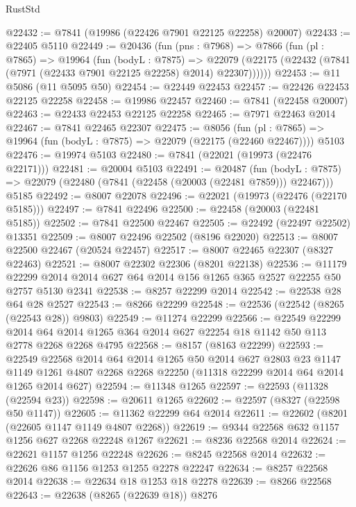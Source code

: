 \begin{lexlean}{RustStd}
\begin{coremodule}
@22432 := @7841 (@19986 (@22426 @7901 @22125 @22258) @20007)
@22433 := @22405 @5110
@22449 := @20436
    (fun (pns : @7968) =>
    @7866
      (fun (pl : @7865) =>
      @19964
        (fun (bodyL : @7875) =>
        @22079 (@22175 (@22432 (@7841 (@7971 (@22433 @7901 @22125 @22258) @2014) @22307))))))
@22453 := @11 @5086 (@11 @5095 @50)
@22454 := @22449 @22453
@22457 := @22426 @22453 @22125 @22258
@22458 := @19986 @22457
@22460 := @7841 (@22458 @20007)
@22463 := @22433 @22453 @22125 @22258
@22465 := @7971 @22463 @2014
@22467 := @7841 @22465 @22307
@22475 := @8056
    (fun (pl : @7865) => @19964 (fun (bodyL : @7875) => @22079 (@22175 (@22460 @22467))))
    @5103
@22476 := @19974 @5103
@22480 := @7841 (@22021 (@19973 (@22476 @22171)))
@22481 := @20004 @5103
@22491 := @20487
    (fun (bodyL : @7875) => @22079 (@22480 (@7841 (@22458 (@20003 (@22481 @7859))) @22467)))
    @5185
@22492 := @8007 @22078
@22496 := @22021 (@19973 (@22476 (@22170 @5185)))
@22497 := @7841 @22496
@22500 := @22458 (@20003 (@22481 @5185))
@22502 := @7841 @22500 @22467
@22505 := @22492 (@22497 @22502) @13351
@22509 := @8007 @22496 @22502 (@8196 @22020)
@22513 := @8007 @22500 @22467 (@20524 @22457)
@22517 := @8007 @22465 @22307 (@8327 @22463)
@22521 := @8007 @22302 @22306 (@8201 @22138)
@22536 := @11179
    @22299
    @2014
    @2014
    @627
    @64
    @2014
    @156
    @1265
    @365
    @2527
    @22255
    @50
    @2757
    @5130
    @2341
@22538 := @8257 @22299 @2014
@22542 := @22538 @28 @64 @28 @2527
@22543 := @8266 @22299
@22548 := @22536 (@22542 (@8265 (@22543 @28)) @9803)
@22549 := @11274 @22299
@22566 := @22549
    @22299
    @2014
    @64
    @2014
    @1265
    @364
    @2014
    @627
    @22254
    @18
    @1142
    @50
    @113
    @2778
    @2268
    @2268
    @4795
@22568 := @8157 (@8163 @22299)
@22593 := @22549
    @22568
    @2014
    @64
    @2014
    @1265
    @50
    @2014
    @627
    @2803
    @23
    @1147
    @1149
    @1261
    @4807
    @2268
    @2268
    @22250
    (@11318 @22299 @2014 @64 @2014 @1265 @2014 @627)
@22594 := @11348 @1265
@22597 := @22593 (@11328 (@22594 @23))
@22598 := @20611 @1265
@22602 := @22597 (@8327 (@22598 @50 @1147))
@22605 := @11362 @22299 @64 @2014
@22611 := @22602 (@8201 (@22605 @1147 @1149 @4807 @2268))
@22619 := @9344 @22568 @632 @1157 @1256 @627 @2268 @22248 @1267
@22621 := @8236 @22568 @2014
@22624 := @22621 @1157 @1256 @22248
@22626 := @8245 @22568 @2014
@22632 := @22626 @86 @1156 @1253 @1255 @2278 @22247
@22634 := @8257 @22568 @2014
@22638 := @22634 @18 @1253 @18 @2278
@22639 := @8266 @22568
@22643 := @22638 (@8265 (@22639 @18)) @8276

\end{coremodule}
\end{lexlean}
